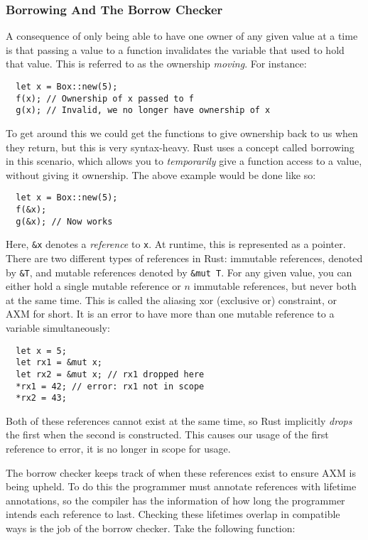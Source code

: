 \documentclass[12pt,twoside]{report}
\begin{document}
\subsubsection{Borrowing And The Borrow Checker}
A consequence of only being able to have one owner of any given value at a time is that passing a value to a function invalidates the variable that used to hold that value. This is referred to as the ownership \textit{moving}. For instance:

\begin{verbatim}
  let x = Box::new(5);
  f(x); // Ownership of x passed to f
  g(x); // Invalid, we no longer have ownership of x
\end{verbatim}

To get around this we could get the functions to give ownership back to us when they return, but this is very syntax-heavy. Rust uses a concept called borrowing in this scenario, which allows you to \textit{temporarily} give a function access to a value, without giving it ownership. The above example would be done like so:

\begin{verbatim}
  let x = Box::new(5);
  f(&x);
  g(&x); // Now works
\end{verbatim}

Here, \verb|&x| denotes a \textit{reference} to \verb|x|. At runtime, this is represented as a pointer. There are two different types of references in Rust: immutable references, denoted by \verb|&T|, and mutable references denoted by \verb|&mut T|. For any given value, you can either hold a single mutable reference or $n$ immutable references, but never both at the same time. This is called the aliasing xor (exclusive or) constraint, or AXM for short. It is an error to have more than one mutable reference to a variable simultaneously:

\begin{verbatim}
  let x = 5;
  let rx1 = &mut x;
  let rx2 = &mut x; // rx1 dropped here
  *rx1 = 42; // error: rx1 not in scope
  *rx2 = 43;
\end{verbatim}

Both of these references cannot exist at the same time, so Rust implicitly \textit{drops} the first when the second is constructed. This causes our usage of the first reference to error, it is no longer in scope for usage.

The borrow checker keeps track of when these references exist to ensure AXM is being upheld. To do this the programmer must annotate references with lifetime annotations, so the compiler has the information of how long the programmer intends each reference to last. Checking these lifetimes overlap in compatible ways is the job of the borrow checker. Take the following function:
\end{document}
